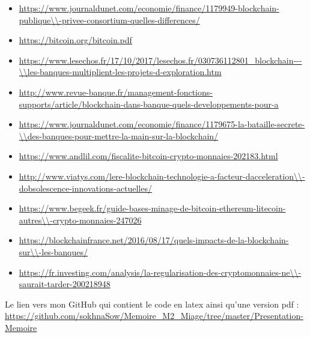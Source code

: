 \documentclass[12pt]{report}
\begin{document}
\begin{itemize}
    \item \url{https://www.journaldunet.com/economie/finance/1179949-blockchain-publique\\-privee-consortium-quelles-differences/}
    \\
    \item \url{https://bitcoin.org/bitcoin.pdf}
    \\
    \item \url{https://www.lesechos.fr/17/10/2017/lesechos.fr/030736112801_blockchain---\\les-banques-multiplient-les-projets-d-exploration.htm}
    \\
    \item \url{http://www.revue-banque.fr/management-fonctions-supports/article/blockchain-dans-banque-quels-developpements-pour-a}
    \\
    \item \url{https://www.journaldunet.com/economie/finance/1179675-la-bataille-secrete-\\des-banques-pour-mettre-la-main-sur-la-blockchain/}
     \\
    \item \url{https://www.andlil.com/fiscalite-bitcoin-crypto-monnaies-202183.html}
     \\
    \item \url{http://www.viatys.com/lere-blockchain-technologie-a-facteur-dacceleration\\-dobsolescence-innovations-actuelles/}
     \\
    \item \url{https://www.begeek.fr/guide-bases-minage-de-bitcoin-ethereum-litecoin-autres\\-crypto-monnaies-247026}
     \\
    \item \url{https://blockchainfrance.net/2016/08/17/quels-impacts-de-la-blockchain-sur\\-les-banques/}
     \\
    \item \url{https://fr.investing.com/analysis/la-regularisation-des-cryptomonnaies-ne\\-saurait-tarder-200218948}
\end{itemize}
\quad

Le lien vers mon GitHub qui contient le code en latex ainsi qu'une version pdf :\\ 
\url{https://github.com/sokhnaSow/Memoire_M2_Miage/tree/master/Presentation-Memoire}
\end{document}

